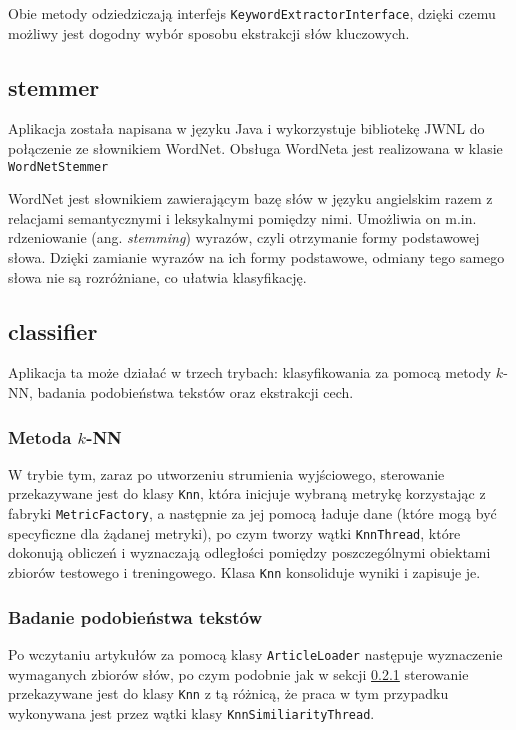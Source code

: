 \documentclass{classrep}
\begin{document}
Obie metody odziedziczają interfejs \verb|KeywordExtractorInterface|, dzięki czemu możliwy jest dogodny wybór sposobu ekstrakcji słów kluczowych.

\subsection{stemmer}
Aplikacja została napisana w języku Java i wykorzystuje bibliotekę JWNL do połączenie ze słownikiem WordNet. Obsługa WordNeta jest realizowana w klasie \verb|WordNetStemmer|
 
WordNet jest słownikiem zawierającym bazę słów w języku angielskim razem z relacjami semantycznymi i leksykalnymi pomiędzy nimi. Umożliwia on m.in. rdzeniowanie (ang. \textit{stemming}) wyrazów, czyli otrzymanie formy podstawowej słowa. Dzięki zamianie wyrazów na ich formy podstawowe, odmiany tego samego słowa nie są rozróżniane, co ułatwia klasyfikację.

\subsection{classifier}
Aplikacja ta może działać w trzech trybach: klasyfikowania za pomocą metody $k$-NN, badania podobieństwa tekstów oraz ekstrakcji cech.

\subsubsection{Metoda $k$-NN}
\label{sec:impl_knn}
W trybie tym, zaraz po utworzeniu strumienia wyjściowego, sterowanie przekazywane jest do klasy \verb|Knn|, która inicjuje wybraną metrykę korzystając z fabryki \verb|MetricFactory|, a następnie za jej pomocą ładuje dane (które mogą być specyficzne dla żądanej metryki), po czym tworzy wątki \verb|KnnThread|, które dokonują obliczeń i wyznaczają odległości pomiędzy poszczególnymi obiektami zbiorów testowego i treningowego. Klasa \verb|Knn| konsoliduje wyniki i zapisuje je.

\subsubsection{Badanie podobieństwa tekstów}
Po wczytaniu artykułów za pomocą klasy \verb|ArticleLoader| następuje wyznaczenie wymaganych zbiorów słów, po czym podobnie jak w sekcji \ref{sec:impl_knn} sterowanie przekazywane jest do klasy \verb|Knn| z tą różnicą, że praca w tym przypadku wykonywana jest przez wątki klasy \verb|KnnSimiliarityThread|.
\end{document}
